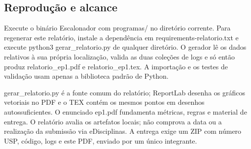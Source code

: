 \documentclass[10pt,a4paper]{article}
\begin{document}
\subsection*{Reprodução e alcance}
Execute o binário Escalonador com programas/ no diretório corrente. Para regenerar este relatório, instale a dependência em requirements-relatorio.txt e execute python3 gerar\_relatorio.py de qualquer diretório. O gerador lê os dados relativos à sua própria localização, valida as duas coleções de logs e só então produz relatorio\_ep1.pdf e relatorio\_ep1.tex. A importação e os testes de validação usam apenas a biblioteca padrão de Python.

gerar\_relatorio.py é a fonte comum do relatório; ReportLab desenha os gráficos vetoriais no PDF e o TEX contém os mesmos pontos em desenhos autossuficientes. O enunciado ep1.pdf fundamenta métricas, regras e material de entrega. O relatório avalia os artefatos locais; não comprova a data ou a realização da submissão via eDisciplinas. A entrega exige um ZIP com número USP, código, logs e este PDF, enviado por um único integrante.
\end{document}
